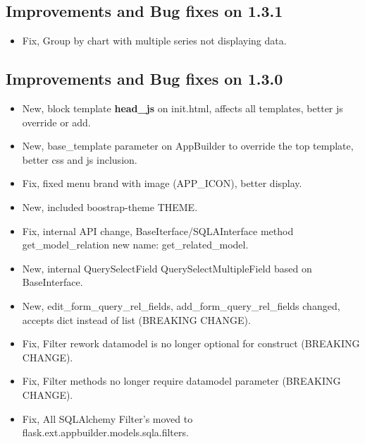 \documentclass[letterpaper,10pt,english]{sphinxmanual}
\begin{document}
\subsection{Improvements and Bug fixes on 1.3.1}
\label{versions:improvements-and-bug-fixes-on-1-3-1}\begin{itemize}
\item {} 
Fix, Group by chart with multiple series not displaying data.

\end{itemize}


\subsection{Improvements and Bug fixes on 1.3.0}
\label{versions:improvements-and-bug-fixes-on-1-3-0}\begin{itemize}
\item {} 
New, block template \textbf{head\_js} on init.html, affects all templates, better js override or add.

\item {} 
New, base\_template parameter on AppBuilder to override the top template, better css and js inclusion.

\item {} 
Fix, fixed menu brand with image (APP\_ICON), better display.

\item {} 
New, included boostrap-theme THEME.

\item {} 
Fix, internal API change, BaseIterface/SQLAInterface method get\_model\_relation new name: get\_related\_model.

\item {} 
New, internal QuerySelectField QuerySelectMultipleField based on BaseInterface.

\item {} 
New, edit\_form\_query\_rel\_fields, add\_form\_query\_rel\_fields changed, accepts dict instead of list (BREAKING CHANGE).

\item {} 
Fix, Filter rework datamodel is no longer optional for construct (BREAKING CHANGE).

\item {} 
Fix, Filter methods no longer require datamodel parameter (BREAKING CHANGE).

\item {} 
Fix, All SQLAlchemy Filter's moved to flask.ext.appbuilder.models.sqla.filters.


\end{itemize}
\end{document}
